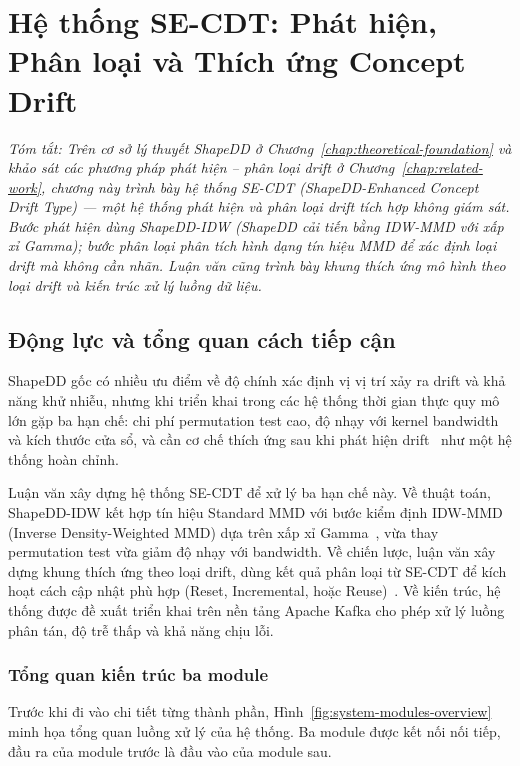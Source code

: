 \chapter{Hệ thống SE-CDT: Phát hiện, Phân loại và Thích ứng Concept Drift}
\label{chap:proposed-model}

\textit{Tóm tắt: Trên cơ sở lý thuyết ShapeDD ở Chương~\ref{chap:theoretical-foundation} và khảo sát các phương pháp phát hiện -- phân loại drift ở Chương~\ref{chap:related-work}, chương này trình bày hệ thống SE-CDT (ShapeDD-Enhanced Concept Drift Type) --- một hệ thống phát hiện và phân loại drift tích hợp không giám sát. Bước phát hiện dùng ShapeDD-IDW (ShapeDD cải tiến bằng IDW-MMD với xấp xỉ Gamma); bước phân loại phân tích hình dạng tín hiệu MMD để xác định loại drift mà không cần nhãn. Luận văn cũng trình bày khung thích ứng mô hình theo loại drift và kiến trúc xử lý luồng dữ liệu.}

\section{Động lực và tổng quan cách tiếp cận}

ShapeDD gốc có nhiều ưu điểm về độ chính xác định vị vị trí xảy ra drift và khả năng khử nhiễu, nhưng khi triển khai trong các hệ thống thời gian thực quy mô lớn gặp ba hạn chế: chi phí permutation test cao, độ nhạy với kernel bandwidth và kích thước cửa sổ, và cần cơ chế thích ứng sau khi phát hiện drift~\cite{yuan2022advances} như một hệ thống hoàn chỉnh.

Luận văn xây dựng hệ thống SE-CDT để xử lý ba hạn chế này. Về thuật toán, ShapeDD-IDW kết hợp tín hiệu Standard MMD với bước kiểm định IDW-MMD (Inverse Density-Weighted MMD) dựa trên xấp xỉ Gamma~\cite{gretton2009gamma}, vừa thay permutation test vừa giảm độ nhạy với bandwidth. Về chiến lược, luận văn xây dựng khung thích ứng theo loại drift, dùng kết quả phân loại từ SE-CDT để kích hoạt cách cập nhật phù hợp (Reset, Incremental, hoặc Reuse)~\cite{gama2014survey, lu2018learning}. Về kiến trúc, hệ thống được đề xuất triển khai trên nền tảng Apache Kafka cho phép xử lý luồng phân tán, độ trễ thấp và khả năng chịu lỗi.

\subsection{Tổng quan kiến trúc ba module}
\label{sec:system-overview}

Trước khi đi vào chi tiết từng thành phần, Hình~\ref{fig:system-modules-overview} minh họa tổng quan luồng xử lý của hệ thống. Ba module được kết nối nối tiếp, đầu ra của module trước là đầu vào của module sau.

